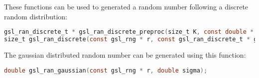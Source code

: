\documentclass{article}
\begin{document}
\begin{enumerate}
These functions can be used to generated a random number following a discrete random distribution:
\begin{lstlisting}[language=C]
gsl_ran_discrete_t * gsl_ran_discrete_preproc(size_t K, const double * P);
size_t gsl_ran_discrete(const gsl_rng * r, const gsl_ran_discrete_t * g);
\end{lstlisting}

The gaussian distributed random number can be generated using this function:
\begin{lstlisting}[language=C]
double gsl_ran_gaussian(const gsl_rng * r, double sigma);
\end{lstlisting}
\end{enumerate}
\end{document}
